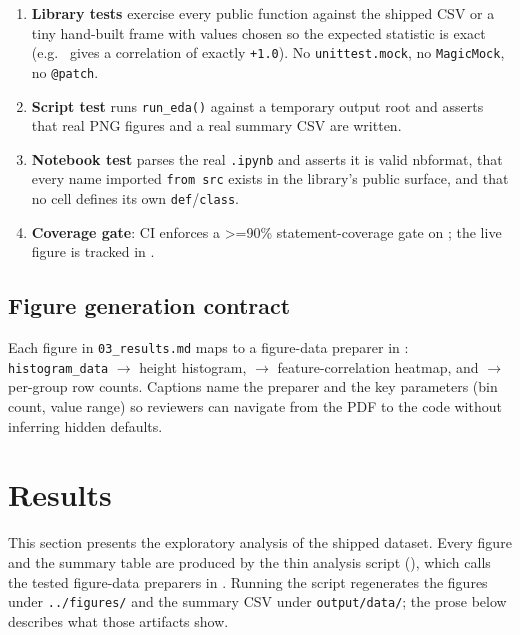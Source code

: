 \documentclass[
]{article}
\providecommand{\tightlist}{%
  \setlength{\itemsep}{0pt}\setlength{\parskip}{0pt}}
\begin{document}
\begin{enumerate}
\def\labelenumi{\arabic{enumi}.}
\tightlist
\item
  \textbf{Library tests} exercise every public function against the
  shipped CSV or a tiny hand-built frame with values chosen so the
  expected statistic is exact (e.g.~
  gives a correlation of exactly \texttt{+1.0}). No
  \texttt{unittest.mock}, no \texttt{MagicMock}, no \texttt{@patch}.
\item
  \textbf{Script test} runs \texttt{run\_eda()} against a temporary
  output root and asserts that real PNG figures and a real summary CSV
  are written.
\item
  \textbf{Notebook test} parses the real \texttt{.ipynb} and asserts it
  is valid nbformat, that every name imported \texttt{from\ src} exists
  in the library's public surface, and that no cell defines its own
  \texttt{def}/\texttt{class}.
\item
  \textbf{Coverage gate}: CI enforces a \texorpdfstring{\textgreater{}=}{>=}90\% statement-coverage gate on
  ; the live
  figure is tracked in
  \href{../../../../docs/_generated/COUNTS.md}{}.
\end{enumerate}

\subsection{Figure generation
contract}\label{figure-generation-contract}

Each figure in \texttt{03\_results.md} maps to a figure-data preparer in
: \texttt{histogram\_data} \texorpdfstring{\ensuremath{\to}}{->} height
histogram,  \texorpdfstring{\ensuremath{\to}}{->} feature-correlation
heatmap, and  \texorpdfstring{\ensuremath{\to}}{->} per-group row counts.
Captions name the preparer and the key parameters (bin count, value
range) so reviewers can navigate from the PDF to the code without
inferring hidden defaults.

\newpage

\section{Results}\label{sec:results}

This section presents the exploratory analysis of the shipped dataset.
Every figure and the summary table are produced by the thin analysis
script
(\href{https://github.com/docxology/template/blob/main/projects/templates/template_eda_notebook/scripts/eda_analysis.py}{}),
which calls the tested figure-data preparers in
. Running the script regenerates the figures
under \texttt{../figures/} and the summary CSV under
\texttt{output/data/}; the prose below describes what those artifacts
show.
\end{document}
